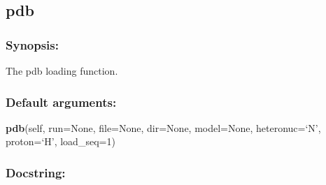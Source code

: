 \newpage

\subsection{pdb}


\subsubsection{Synopsis:}

The pdb loading function.

\subsubsection{Default arguments:}

\textsf{\textbf{pdb}(self, run=None, file=None, dir=None, model=None, heteronuc=`N', proton=`H', load\_seq=1)
}


\subsubsection{Docstring:}


